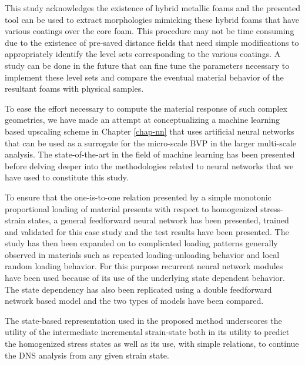 This study acknowledges the existence of hybrid metallic foams\cite{jungHybridMetalFoams2014} and the presented tool can be used to extract morphologies mimicking these hybrid foams that have various coatings over the core foam. This procedure may not be time consuming due to the existence of pre-saved distance fields that need simple modifications to appropriately identify the level sets corresponding to the various coatings. A study can be done in the future that can fine tune the parameters necessary to implement these level sets and compare the eventual material behavior of the resultant foams with physical samples.


To ease the effort necessary to compute the material response of such complex geometries, we have made an attempt at conceptualizing a machine learning based upscaling scheme in Chapter \ref{chap-nn} that uses artificial neural networks that can be used as a surrogate for the micro-scale BVP in the larger multi-scale analysis. The state-of-the-art in the field of machine learning has been presented before delving deeper into the methodologies related to neural networks that we have used to constitute this study.

To ensure that the one-is-to-one relation presented by a simple monotonic proportional loading of material presents with respect to homogenized stress-strain states, a general feedforward neural network has been presented, trained and validated for this case study and the test results have been presented. The study has then been expanded on to complicated loading patterns generally observed in materials such as repeated loading-unloading behavior and local random loading behavior. For this purpose recurrent neural network modules have been used because of its use of the underlying state dependent behavior. The state dependency has also been replicated using a double feedforward network based model and the two types of models have been compared. 

The state-based representation used in the proposed \fnn method underscores the utility of the intermediate incremental strain-state both in its utility to predict the homogenized stress states as well as its use, with simple relations, to continue the DNS analysis from any given strain state. 

